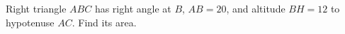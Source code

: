 Right triangle $ ABC $ has right angle at $ B $, $ AB=20 $, and altitude $ BH=12 $ to hypotenuse $ AC $. Find its area.

